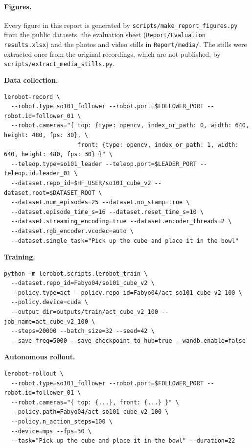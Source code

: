 \documentclass[11pt,a4paper]{article}
\begin{document}
\paragraph{Figures.} Every figure in this report is generated by
\texttt{scripts/make\_report\_figures.py} from the public datasets, the
evaluation sheet (\texttt{Report/Evaluation results.xlsx}) and the photos and
video stills in \texttt{Report/media/}. The stills were extracted once from the
original recordings, which are not published, by
\texttt{scripts/extract\_media\_stills.py}.

\medskip\noindent\textbf{Data collection.}\par
\begin{lstlisting}
lerobot-record \
  --robot.type=so101_follower --robot.port=$FOLLOWER_PORT --robot.id=follower_01 \
  --robot.cameras="{ top: {type: opencv, index_or_path: 0, width: 640, height: 480, fps: 30}, \
                     front: {type: opencv, index_or_path: 1, width: 640, height: 480, fps: 30} }" \
  --teleop.type=so101_leader --teleop.port=$LEADER_PORT --teleop.id=leader_01 \
  --dataset.repo_id=$HF_USER/so101_cube_v2 --dataset.root=$DATASET_ROOT \
  --dataset.num_episodes=25 --dataset.no_stamp=true \
  --dataset.episode_time_s=16 --dataset.reset_time_s=10 \
  --dataset.streaming_encoding=true --dataset.encoder_threads=2 \
  --dataset.rgb_encoder.vcodec=auto \
  --dataset.single_task="Pick up the cube and place it in the bowl"
\end{lstlisting}

\medskip\noindent\textbf{Training.}\par
\begin{lstlisting}
python -m lerobot.scripts.lerobot_train \
  --dataset.repo_id=Fabyo04/so101_cube_v2 \
  --policy.type=act --policy.repo_id=Fabyo04/act_so101_cube_v2_100 \
  --policy.device=cuda \
  --output_dir=outputs/train/act_cube_v2_100 --job_name=act_cube_v2_100 \
  --steps=20000 --batch_size=32 --seed=42 \
  --save_freq=5000 --save_checkpoint_to_hub=true --wandb.enable=false
\end{lstlisting}

\medskip\noindent\textbf{Autonomous rollout.}\par
\begin{lstlisting}
lerobot-rollout \
  --robot.type=so101_follower --robot.port=$FOLLOWER_PORT --robot.id=follower_01 \
  --robot.cameras="{ top: {...}, front: {...} }" \
  --policy.path=Fabyo04/act_so101_cube_v2_100 \
  --policy.n_action_steps=100 \
  --device=mps --fps=30 \
  --task="Pick up the cube and place it in the bowl" --duration=22
\end{lstlisting}
\end{document}
